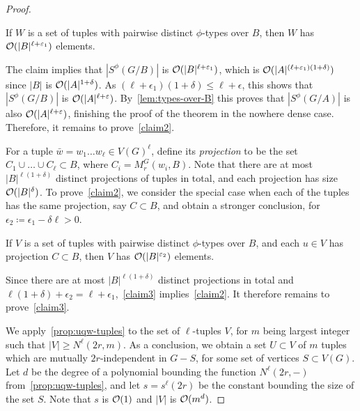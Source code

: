 \begin{proof}
	
	\setcounter{claim}{0}
\begin{claim}\label{claim2}
	If $W$ is a set of tuples with pairwise distinct $\phi$-types over $B$, then	
	 $W$ has  	$\mathcal{O}(|B|^{\ell+\varepsilon_1})$ elements.
\end{claim}	
The claim implies that $|S^\phi(G/B)|$ is $\mathcal{O}(|B|^{\ell+\varepsilon_1})$, which is $\mathcal{O}(|A|^{(\ell+\varepsilon_1)(1+\delta)})$ since $|B|$ is $\mathcal{O}(|A|^{1+\delta})$. As $(\ell+\epsilon_1)(1+\delta)\le \ell+\epsilon$, this shows that $|S^\phi(G/B)|$
is $\mathcal{O}(|A|^{\ell+\varepsilon})$.
By~\cref{lem:types-over-B} this proves that $|S^\phi(G/A)|$ is also $\mathcal{O}(|A|^{\ell+\varepsilon})$, finishing the proof of the theorem in the nowhere dense case.
	Therefore, it remains to prove~\cref{claim2}.

	
	

\medskip  
For a tuple $\bar w=w_1\ldots w_\ell\in V(G)^\ell$, define its \emph{projection}
to be the set $C_1\cup\ldots\cup C_\ell\subset B$, where  
$C_i=M^G_r(w_i, B)$. Note that there are at most 
$|B|^{\ell(1+\delta)}$ distinct projections of tuples in total, and each projection has size $\mathcal{O}(|B|^\delta)$.
To prove~\cref{claim2}, we  consider the special case when each of the tuples has the same projection, say $C\subset B$, and  obtain a stronger conclusion,
for $\epsilon_2\coloneqq \epsilon_1-\delta\ell>0$.
\begin{claim}\label{claim3}
	If $V$ is a set of tuples with pairwise distinct $\phi$-types over $B$, and each $u\in V$ has projection $C\subset B$, then	
	 $V$ has   	$\mathcal{O}(|B|^{\varepsilon_2})$ elements.
\end{claim}
Since there are at most $|B|^{\ell(1+\delta)}$ distinct projections in total and $\ell(1+\delta)+\epsilon_2=\ell+\epsilon_1$,~\cref{claim3} implies~\cref{claim2}. It therefore remains to prove~\cref{claim3}.

\medskip
We  apply~\cref{prop:uqw-tuples} to the set of $\ell$-tuples $V$, for $m$ being largest integer such that $|V|\ge N^{\ell}(2r,m)$.
  As a conclusion, we obtain a set $U\subset V$  of $m$ tuples which are mutually $2r$-independent in $G-S$, for some set of vertices $S\subset V(G)$.
  Let $d$ be the degree of a polynomial bounding 
    the function $N^\ell(2r,-)$ from~\cref{prop:uqw-tuples},
    and let $s=s^{\ell}(2r)$ be the constant bounding the size of the set $S$.
      Note that $s$ is $\mathcal{O}(1)$ and $|V|$ is $\mathcal{O}(m^d)$.
  

\end{proof}
